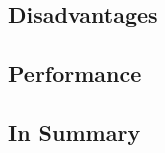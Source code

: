 \documentclass[titlepage, a4paper, 11pt]{scrartcl}
\begin{document}

        \subsection{Disadvantages}


        \subsection{Performance}
    


        \subsection{In Summary}

      

            
    
\end{document}
